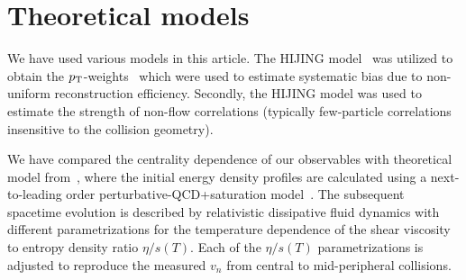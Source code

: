 \documentclass[ALICE,manyauthors]{cernphprep}
\begin{document}
 
%




\section{Theoretical models}
\label{sec:models}
We have used various models in this article. The {HIJING} model~\cite{Wang:1991hta,Gyulassy:1994ew} was utilized to obtain the $p_{\textnormal{T}}{}$-weights~\cite{Bilandzic:2013kga} which were used to estimate systematic bias due to non-uniform reconstruction efficiency. Secondly, the HIJING model was used to estimate the strength of non-flow correlations (typically few-particle correlations insensitive to the collision geometry). 

We have compared the centrality dependence of our observables with theoretical model from~\cite{Niemi:2015qia}, where the initial energy density profiles are calculated using a next-to-leading order perturbative-QCD+saturation model~\cite{Paatelainen:2012at,Paatelainen:2013eea}. The subsequent spacetime evolution is described by relativistic dissipative fluid dynamics with different parametrizations for the temperature dependence of the shear viscosity to entropy density ratio $\eta/s(T)$. Each of the $\eta/s(T)$ parametrizations is adjusted to reproduce the measured $v_n$ from central to mid-peripheral collisions. 
\end{document}
